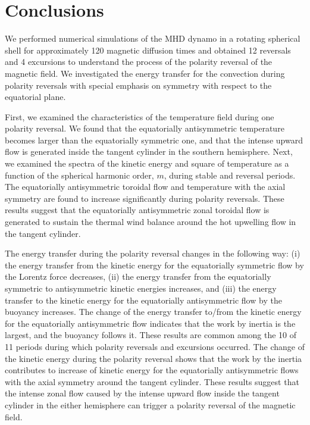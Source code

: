 \section{Conclusions}
\label{section:conclusions}

We performed numerical simulations of the MHD dynamo in a rotating spherical shell for approximately %
120 magnetic diffusion times 
and obtained 12 reversals and 4 excursions to understand the process of the polarity reversal of the magnetic field. 
We investigated the energy transfer for the convection during polarity reversals with special emphasis on symmetry with respect to the equatorial plane.

First, we examined the characteristics of the temperature field during one polarity reversal. 
We found that the equatorially antisymmetric temperature becomes larger than the equatorially symmetric one, and that the intense upward flow is generated inside the tangent cylinder in the southern hemisphere. 
Next, we examined the spectra of the kinetic energy and square of temperature as a function of the spherical harmonic order, $m$, %
during stable and reversal periods.
The equatorially antisymmetric toroidal flow and temperature with the axial symmetry are found to increase significantly during polarity reversals.
These results suggest that the equatorially antisymmetric zonal toroidal flow is generated to sustain the thermal wind balance around the hot upwelling flow in the tangent cylinder.

The energy transfer during the polarity reversal changes in the following way: 
(i) the energy transfer from the kinetic energy for the equatorially symmetric flow by the Lorentz force decreases, 
(ii) the energy transfer from the equatorially symmetric to antisymmetric kinetic energies increases, and (iii) the energy transfer to the kinetic energy for the equatorially antisymmetric flow by the buoyancy increases. 
The change of the energy transfer to/from the kinetic energy for the equatorially antisymmetric flow indicates that the work by inertia is the largest, and the buoyancy follows it. 
These results are common among the 10 of 11 periods during which polarity reversals and excursions occurred. 
The change of the kinetic energy during the polarity reversal shows that the work by the inertia contributes to increase of kinetic energy for the equatorially antisymmetric flows with the axial symmetry around the tangent cylinder. 
These results suggest that the intense zonal flow caused by the intense upward flow inside the tangent cylinder in the either hemisphere can trigger a polarity reversal of the magnetic field.

